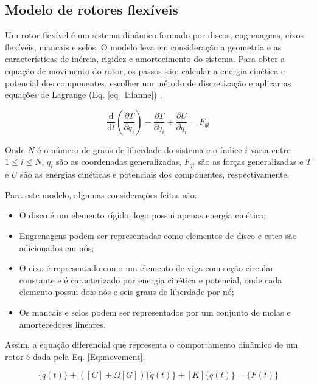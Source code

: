 \subsection{Modelo de rotores flexíveis}

Um rotor flexível é um sistema dinâmico formado por discos, engrenagens, eixos flexíveis, mancais e selos. O modelo leva em consideração a geometria e as características de inércia, rigidez e amortecimento do sistema. Para obter a equação de movimento do rotor, os passos são: calcular a energia cinética e potencial dos componentes, escolher um método de discretização e aplicar as equações de Lagrange (Eq. \ref{eq_lalanne}) \citep{Lalanne1998}.

\begin{equation}
	\frac{\mathrm{d} }{\mathrm{d} t}\left ( \frac{\partial T}{\partial \dot{q_i}} \right )-\frac{\partial T}{\partial q_i} + \frac{\partial U}{\partial q_i}=F_{qi}
	\label{eq_lalanne}
\end{equation}

Onde $N$ é o número de graus de liberdade do sistema e o índice $i$ varia entre $1 \leq i \leq N$, $q_{i}$ são as coordenadas generalizadas, $F_{qi}$ são as forças generalizadas e $T$ e $U$ são as energias cinéticas e potenciais dos componentes, respectivamente.

Para este modelo, algumas considerações feitas são:
\begin{itemize}
	\item O disco é um elemento rígido, logo possui apenas energia cinética;
	\item Engrenagens podem ser representadas como elementos de disco e estes são adicionados em nós;
	\item O eixo é representado como um elemento de viga com seção circular constante e é caracterizado por energia cinética e potencial, onde cada elemento possui dois nós e seis graus de liberdade por nó;
	\item Os mancais e selos podem ser representados por um conjunto de molas e amortecedores lineares.
\end{itemize}

Assim, a equação diferencial que representa o comportamento dinâmico de um rotor é dada pela Eq. \ref{Eq:movement}.

\begin{equation}
	[M]\{\ddot{q}(t)\}+([C]+\Omega [G])\{\dot{q}(t)\}+[K]\{q(t)\}=\{F(t)\}
	\label{Eq:movement}
\end{equation}

